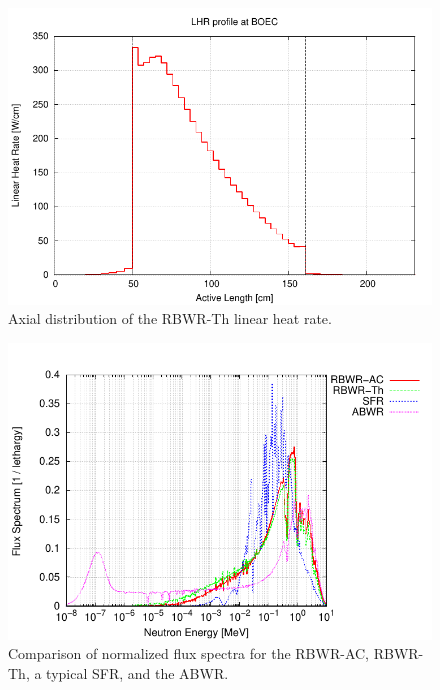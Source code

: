 \documentclass[11pt]{article}
\begin{document}
\clearpage
\begin{figure}[p]
  \centering
  \includegraphics[width=\textwidth, trim=0 0 0 0.275in, clip]{./img/Th-lhr.pdf}
  \caption{Axial distribution of the RBWR-Th linear heat rate.}
  \label{fig:lhr}
\end{figure}

\clearpage
\begin{figure}[p]
  \centering
  \includegraphics[width=\textwidth, trim=0 0 0 0.275in, clip]{./img/fluxSpectra.pdf}
  \caption{Comparison of normalized flux spectra for the RBWR-AC, RBWR-Th, a typical SFR, and the ABWR.}
  \label{fig:flx}
\end{figure}
\end{document}

